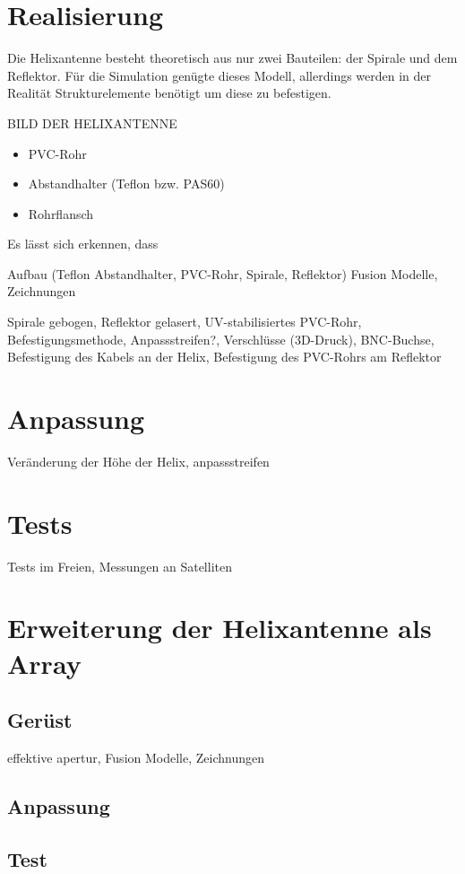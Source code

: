 \section{Realisierung}
Die Helixantenne besteht theoretisch aus nur zwei Bauteilen: der Spirale und dem Reflektor. Für die Simulation genügte dieses Modell, allerdings werden in der Realität Strukturelemente benötigt um diese zu befestigen.

BILD DER HELIXANTENNE

\begin{itemize}
	\item PVC-Rohr
	\item Abstandhalter (Teflon bzw. PAS60)
	\item Rohrflansch
\end{itemize}

Es lässt sich erkennen, dass 

Aufbau (Teflon Abstandhalter, PVC-Rohr, Spirale, Reflektor) Fusion Modelle, Zeichnungen

Spirale gebogen, Reflektor gelasert, UV-stabilisiertes PVC-Rohr, Befestigungsmethode, Anpassstreifen?, Verschlüsse (3D-Druck), BNC-Buchse, Befestigung des Kabels an der Helix, Befestigung des PVC-Rohrs am Reflektor

\section{Anpassung}
Veränderung der Höhe der Helix, anpassstreifen

\section{Tests}
Tests im Freien, Messungen an Satelliten

\section{Erweiterung der Helixantenne als Array}

\subsection{Gerüst}
effektive apertur, Fusion Modelle, Zeichnungen

\subsection{Anpassung}

\subsection{Test}